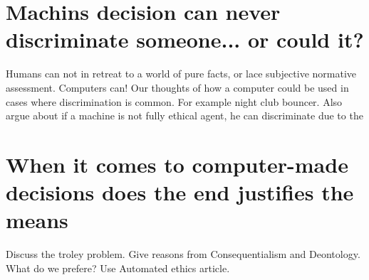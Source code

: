 \documentclass[11pt]{article}
\begin{document}
\section{Machins decision can never discriminate someone... or could it?}
Humans can not in retreat to a world of pure facts, or lace subjective normative assessment. Computers can!
Our thoughts of how a computer could be used in cases where discrimination is common. For example night club bouncer. Also argue about if a machine is not fully ethical agent, he can discriminate due to the

\section{When it comes to computer-made decisions does the end justifies the means}
Discuss the troley problem. Give reasons from Consequentialism and Deontology.
What do we prefere? Use Automated ethics article.




\end{document}
